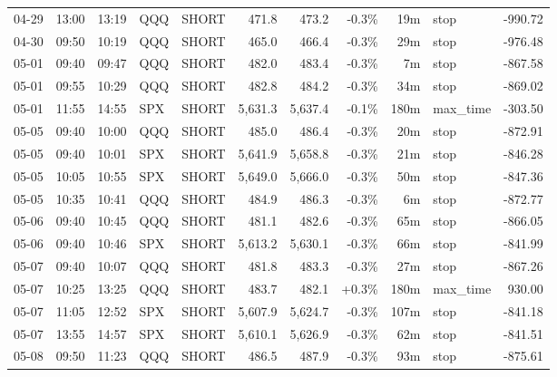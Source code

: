 \documentclass[11pt,a4paper,twoside]{article}
\begin{document}
\begin{center}
\begin{longtable}{>{\color{txtmain}}l l l l l r r r r >{\color{txtmain}}l r}
04-29 & 13:00 & 13:19 & QQQ & SHORT & 471.8 & 473.2 & \textcolor{lossred}{-0.3\%} & 19m & stop & \textcolor{lossred}{-990.72} \\
04-30 & 09:50 & 10:19 & QQQ & SHORT & 465.0 & 466.4 & \textcolor{lossred}{-0.3\%} & 29m & stop & \textcolor{lossred}{-976.48} \\
05-01 & 09:40 & 09:47 & QQQ & SHORT & 482.0 & 483.4 & \textcolor{lossred}{-0.3\%} & 7m & stop & \textcolor{lossred}{-867.58} \\
05-01 & 09:55 & 10:29 & QQQ & SHORT & 482.8 & 484.2 & \textcolor{lossred}{-0.3\%} & 34m & stop & \textcolor{lossred}{-869.02} \\
05-01 & 11:55 & 14:55 & SPX & SHORT & 5,631.3 & 5,637.4 & \textcolor{lossred}{-0.1\%} & 180m & max\_time & \textcolor{lossred}{-303.50} \\
05-05 & 09:40 & 10:00 & QQQ & SHORT & 485.0 & 486.4 & \textcolor{lossred}{-0.3\%} & 20m & stop & \textcolor{lossred}{-872.91} \\
05-05 & 09:40 & 10:01 & SPX & SHORT & 5,641.9 & 5,658.8 & \textcolor{lossred}{-0.3\%} & 21m & stop & \textcolor{lossred}{-846.28} \\
05-05 & 10:05 & 10:55 & SPX & SHORT & 5,649.0 & 5,666.0 & \textcolor{lossred}{-0.3\%} & 50m & stop & \textcolor{lossred}{-847.36} \\
05-05 & 10:35 & 10:41 & QQQ & SHORT & 484.9 & 486.3 & \textcolor{lossred}{-0.3\%} & 6m & stop & \textcolor{lossred}{-872.77} \\
05-06 & 09:40 & 10:45 & QQQ & SHORT & 481.1 & 482.6 & \textcolor{lossred}{-0.3\%} & 65m & stop & \textcolor{lossred}{-866.05} \\
05-06 & 09:40 & 10:46 & SPX & SHORT & 5,613.2 & 5,630.1 & \textcolor{lossred}{-0.3\%} & 66m & stop & \textcolor{lossred}{-841.99} \\
05-07 & 09:40 & 10:07 & QQQ & SHORT & 481.8 & 483.3 & \textcolor{lossred}{-0.3\%} & 27m & stop & \textcolor{lossred}{-867.26} \\
05-07 & 10:25 & 13:25 & QQQ & SHORT & 483.7 & 482.1 & \textcolor{wingreen}{+0.3\%} & 180m & max\_time & \textcolor{wingreen}{930.00} \\
05-07 & 11:05 & 12:52 & SPX & SHORT & 5,607.9 & 5,624.7 & \textcolor{lossred}{-0.3\%} & 107m & stop & \textcolor{lossred}{-841.18} \\
05-07 & 13:55 & 14:57 & SPX & SHORT & 5,610.1 & 5,626.9 & \textcolor{lossred}{-0.3\%} & 62m & stop & \textcolor{lossred}{-841.51} \\
05-08 & 09:50 & 11:23 & QQQ & SHORT & 486.5 & 487.9 & \textcolor{lossred}{-0.3\%} & 93m & stop & \textcolor{lossred}{-875.61} \\

\end{longtable}
\end{center}
\end{document}
